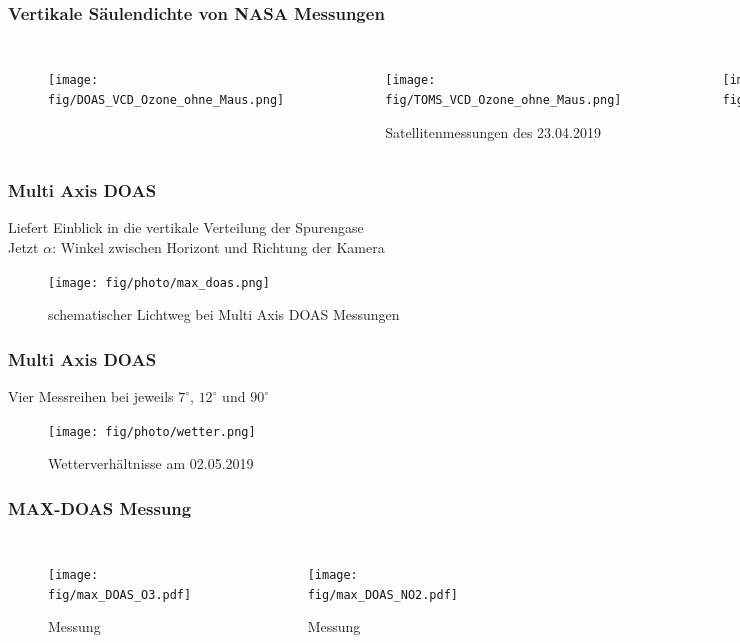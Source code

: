 \documentclass{beamer}
\begin{document}
\begin{frame}
	\frametitle{Vertikale Säulendichte  von NASA Messungen}
	\vspace{-0.35cm}
	\begin{columns}
		\begin{figure}	
    		\texttt{[image: fig/DOAS\_VCD\_Ozone\_ohne\_Maus.png]}
    	\end{figure}
    	\vspace{-1cm}
    	\begin{figure}
    		\texttt{[image: fig/TOMS\_VCD\_Ozone\_ohne\_Maus.png]}
    		\caption{ Satellitenmessungen des 23.04.2019 \cite{giovanni_nasa}}
    	\end{figure}		
      	\begin{figure}	
      		\texttt{[image: fig/DOAS\_VCD\_Ozone\_legende.png]}
      	\end{figure}
	\end{columns}
\end{frame}

\begin{frame}
    \frametitle{Multi Axis DOAS}
    Liefert Einblick in die vertikale Verteilung der Spurengase \\
    Jetzt $\alpha$: Winkel zwischen Horizont und Richtung der Kamera
    \begin{figure}
        \texttt{[image: fig/photo/max\_doas.png]}
        \caption{schematischer Lichtweg bei Multi Axis DOAS Messungen \cite{atm_script}}
    \end{figure}
\end{frame}

\begin{frame}
    \frametitle{Multi Axis DOAS}
    Vier Messreihen bei jeweils $7^\circ$, $12^\circ$ und $90^\circ$ \\
    \begin{figure}
    	\texttt{[image: fig/photo/wetter.png]}
    	\caption{Wetterverhältnisse am 02.05.2019}
    \end{figure}
\end{frame}

\begin{frame}
    \frametitle{MAX-DOAS Messung}
    \begin{columns}
    	\begin{figure}
    		\texttt{[image: fig/max\_DOAS\_O3.pdf]}
    		\caption{Messung \ch{O3}}
    	\end{figure}
	  \column{0.5\linewidth}
	  	\begin{figure}
	  			\texttt{[image: fig/max\_DOAS\_NO2.pdf]}
	  			\caption{Messung \ch{NO2}}
	  	\end{figure}
	\end{columns}
\end{frame}
\end{document}

